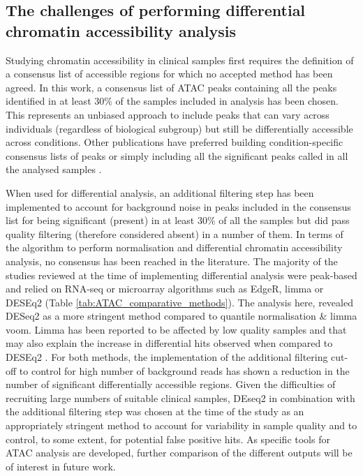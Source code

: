 

\subsection{The challenges of performing differential chromatin accessibility analysis}
Studying chromatin accessibility in clinical samples first requires the definition of a consensus list of accessible regions for which no accepted method has been agreed. In this work, a consensus list of ATAC peaks containing all the peaks identified in at least 30\% of the samples included in analysis has been chosen. This represents an unbiased approach to include peaks that can vary across individuals (regardless of biological subgroup) but still be differentially accessible across conditions. Other publications have preferred building condition-specific consensus lists of peaks or simply including all the significant peaks called in all the analysed samples \parencite{Alasoo2018, Thurner2018}. 

When used for differential analysis, an additional filtering step has been implemented to account for background noise in peaks included in the consensus list for being significant (present) in at least 30\% of all the samples but did pass quality filtering (therefore considered absent) in a number of them. In terms of the algorithm to perform normalisation and differential chromatin accessibility analysis, no consensus has been reached in the literature. The majority of the studies reviewed at the time of implementing differential analysis were peak-based and relied on RNA-seq or microarray algorithms such as EdgeR, limma or DESEq2 (Table \ref{tab:ATAC_comparative_methods}). The analysis here, revealed DESeq2 as a more stringent method compared to quantile normalisation \& limma voom. Limma has been reported to be affected by low quality samples and that may also explain the increase in differential hits observed when compared to DESEq2 \parencite{Alasoo2018}. For both methods, the implementation of the additional filtering cut-off to control for high number of background reads has shown a reduction in the number of significant differentially accessible regions. Given the difficulties of recruiting large numbers of suitable clinical samples, DEseq2 in combination with the additional filtering step was chosen at the time of the study as an appropriately stringent method to account for variability in sample quality and to control, to some extent, for potential false positive hits. As specific tools for ATAC analysis are developed, further comparison of the different outputs will be of interest in future work.


